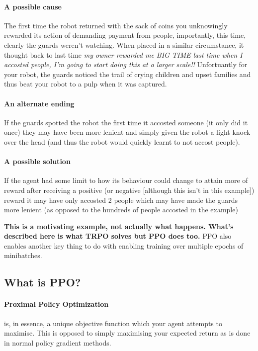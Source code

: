 \documentclass{article}
\begin{document}
\begin{enumerate}
\paragraph{A possible cause} The first time the robot returned with the sack of coins you unknowingly rewarded its action of demanding payment from people, importantly, this time, clearly the guards weren't watching. When placed in a similar circumstance, it thought back to last time \emph{my owner rewarded me BIG TIME last time when I accosted people, I'm going to start doing this at a larger scale!!} Unfortuantly for your robot, the guards noticed the trail of crying children and upset families and thus beat your robot to a pulp when it was captured.
\paragraph{An alternate ending} If the guards spotted the robot the first time it accosted someone (it only did it once) they may have been more lenient and simply given the robot a light knock over the head (and thus the robot would quickly learnt to not accost people).
\paragraph{A possible solution} If the agent had some limit to how its behaviour could change to attain more of reward after receiving a positive (or negative [although this isn't in this example]) reward it may have only accosted 2 people which may have made the guards more lenient (as opposed to the hundreds of people accosted in the example)

\textbf{This is a motivating example, not actually what happens. What's described here is what TRPO solves but PPO does too.} PPO also enables another key thing to do with enabling training over multiple epochs of minibatches. 

\end{enumerate}

\subsection{What is PPO?}

\paragraph{Proximal Policy Optimization} is, in essence, a unique objective function which your agent attempts to maximise. This is opposed to simply maximising your expected return as is done in normal policy gradient methods.
\end{document}
